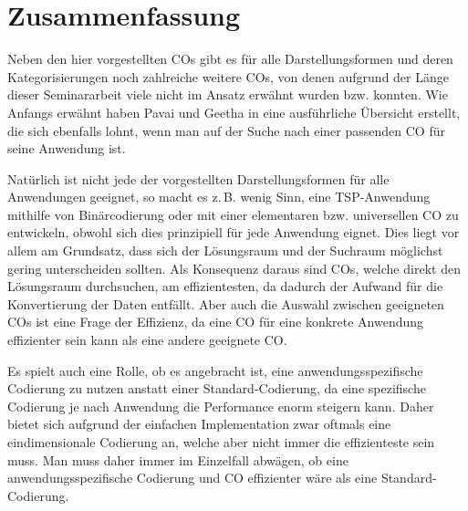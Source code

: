 \documentclass{llncs}
\newcommand{\zB}{z.\,B. }
\begin{document}

\section{Zusammenfassung}
\label{sec:ZusFass}

	Neben den hier vorgestellten COs gibt es für alle Darstellungsformen und deren Kategorisierungen noch zahlreiche weitere COs, von denen aufgrund der Länge dieser Seminararbeit viele nicht im Ansatz erwähnt wurden bzw. konnten. Wie Anfangs erwähnt haben Pavai und Geetha in \cite{Survey} eine ausführliche Übersicht erstellt, die sich ebenfalls lohnt, wenn man auf der Suche nach einer passenden CO für seine Anwendung ist.
	
	Natürlich ist nicht jede der vorgestellten Darstellungsformen für alle Anwendungen geeignet, so macht es \zB wenig Sinn, eine TSP-Anwendung mithilfe von Binärcodierung oder mit einer elementaren bzw. universellen CO zu entwickeln, obwohl sich dies prinzipiell für jede Anwendung eignet. Dies liegt vor allem am Grundsatz, dass sich der Lösungsraum und der Suchraum möglichst gering unterscheiden sollten. \cite{TacklingRealCodedGA} Als Konsequenz daraus sind COs, welche direkt den Lösungsraum durchsuchen, am effizientesten, da dadurch der Aufwand für die Konvertierung der Daten entfällt. Aber auch die Auswahl zwischen geeigneten COs ist eine Frage der Effizienz, da eine CO für eine konkrete Anwendung effizienter sein kann als eine andere geeignete CO.
	
	Es spielt auch eine Rolle, ob es angebracht ist, eine anwendungsspezifische Codierung zu nutzen anstatt einer Standard-Codierung, da eine spezifische Codierung je nach Anwendung die Performance enorm steigern kann. Daher bietet sich aufgrund der einfachen Implementation zwar oftmals eine eindimensionale Codierung an, welche aber nicht immer die effizienteste sein muss. Man muss daher immer im Einzelfall abwägen, ob eine anwendungsspezifische Codierung und CO effizienter wäre als eine Standard-Codierung.
	
\pagebreak
	
 

\end{document}
